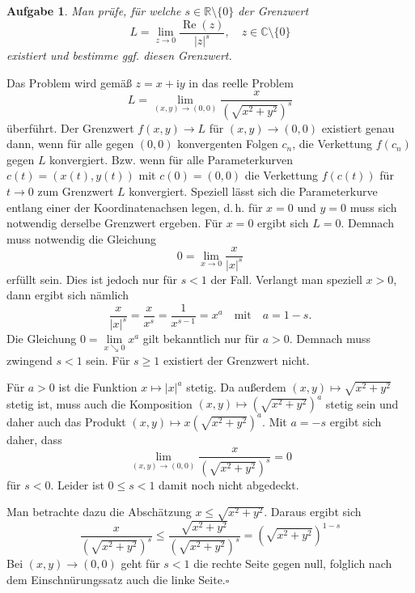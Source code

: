 \documentclass[a4paper,10pt,fleqn,twoside]{scrartcl}
\numberwithin{equation}{section}
\newcommand{\R}{\mathbb R}
\newcommand{\C}{\mathbb C}
\newcommand{\ui}{\mathrm i}
\newcommand{\real}{\operatorname{Re}}
\newcommand{\strong}[1]{{\normalfont\sffamily\bfseries #1}}
\renewcommand{\qedsymbol}{\ensuremath{\square}}
\theoremstyle{Aufgabe}
\newtheorem{Aufgabe}{\sffamily Aufgabe}[section]
\begin{document}
\begin{Aufgabe}
Man prüfe, für welche $s\in\R\setminus\{0\}$ der Grenzwert
\[L = \lim_{z\to 0} \frac{\real(z)}{|z|^s},\quad z\in\C\setminus\{0\}\]
existiert und bestimme ggf. diesen Grenzwert.
\end{Aufgabe}
\noindent\strong{Lösung.} Das Problem wird gemäß $z=x+\ui y$ in das reelle
Problem
\begin{equation}
L = \lim_{(x,y)\to (0,0)} \frac{x}{(\sqrt{x^2+y^2})^s}
\end{equation}
überführt. Der Grenzwert $f(x,y)\to L$ für $(x,y)\to (0,0)$ existiert
genau dann, wenn für alle gegen $(0,0)$ konvergenten Folgen $c_n$, die
Verkettung $f(c_n)$ gegen $L$ konvergiert. Bzw. wenn für alle
Parameterkurven $c(t)=(x(t),y(t))$ mit $c(0)=(0,0)$ die Verkettung
$f(c(t))$ für $t\to 0$ zum Grenzwert $L$ konvergiert. Speziell lässt
sich die Parameterkurve entlang einer der Koordinatenachsen legen,
d.\,h. für $x=0$ und $y=0$ muss sich notwendig derselbe Grenzwert
ergeben. Für $x=0$ ergibt sich $L=0$.
Demnach muss notwendig die Gleichung%
\begin{equation}
0 = \lim_{x\to 0} \frac{x}{|x|^s}
\end{equation}
erfüllt sein. Dies ist jedoch nur für $s<1$ der Fall. Verlangt man
speziell $x>0$, dann ergibt sich nämlich%
\begin{equation}
\frac{x}{|x|^s} = \frac{x}{x^s} = \frac{1}{x^{s-1}}
= x^a\quad\text{mit}\quad a=1-s.
\end{equation}
Die Gleichung $0=\lim\limits_{x\searrow 0} x^a$ gilt bekanntlich nur für
$a>0$. Demnach muss zwingend $s<1$ sein. Für $s\ge 1$ existiert der
Grenzwert nicht.

Für $a>0$ ist die Funktion $x\mapsto |x|^a$ stetig. Da außerdem
$(x,y)\mapsto\sqrt{x^2+y^2}$ stetig ist, muss auch die Komposition
$(x,y)\mapsto (\sqrt{x^2+y^2})^a$ stetig sein und daher auch das
Produkt $(x,y)\mapsto x(\sqrt{x^2+y^2})^a$. Mit $a=-s$ ergibt sich
daher, dass%
\begin{equation}
\lim_{(x,y)\to (0,0)} \frac{x}{(\sqrt{x^2+y^2})^s} = 0
\end{equation}
für $s<0$. Leider ist $0\le s<1$ damit noch nicht abgedeckt.

Man betrachte dazu die Abschätzung $x\le\sqrt{x^2+y^2}$. Daraus
ergibt sich
\begin{equation}
\frac{x}{(\sqrt{x^2+y^2})^s} \le \frac{\sqrt{x^2+y^2}}{(\sqrt{x^2+y^2})^s}
= (\sqrt{x^2+y^2})^{1-s}
\end{equation}
Bei $(x,y)\to (0,0)$ geht für $s<1$ die rechte Seite gegen null,
folglich nach dem Einschnürungssatz auch die linke Seite.\;\qedsymbol
\end{document}
